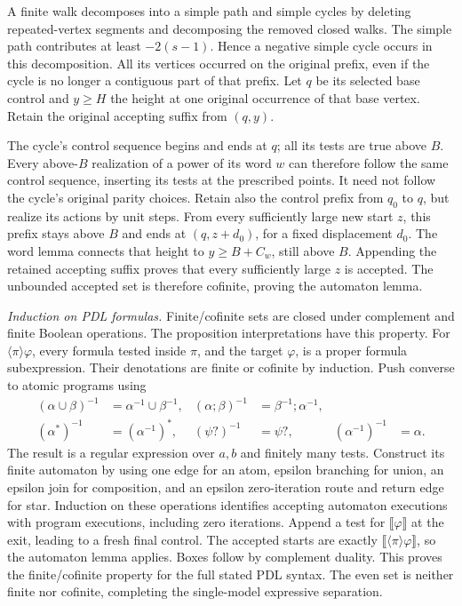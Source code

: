 A finite walk decomposes into a simple path
and simple cycles by deleting repeated-vertex
segments and decomposing the removed closed walks.
The simple path contributes at least
\(-2(s-1)\). Hence a negative simple cycle
occurs in this decomposition. All its vertices
occurred on the original prefix, even if the
cycle is no longer a contiguous part of that
prefix. Let \(q\) be its selected base control
and \(y\geq H\) the height at one original
occurrence of that base vertex. Retain the
original accepting suffix from \((q,y)\).

The cycle's control sequence begins and ends
at \(q\); all its tests are true above \(B\).
Every above-\(B\) realization of a power of
its word \(w\) can therefore follow the same
control sequence, inserting its tests at the
prescribed points. It need not follow the
cycle's original parity choices.
Retain also the control prefix from \(q_0\)
to \(q\), but realize its actions by unit
steps. From every sufficiently large new
start \(z\), this prefix stays above \(B\)
and ends at \((q,z+d_0)\), for a fixed
displacement \(d_0\).
The word lemma connects that height to
\(y\geq B+C_w\), still above \(B\).
Appending the retained accepting suffix
proves that every sufficiently large \(z\)
is accepted. The unbounded accepted set is
therefore cofinite, proving the automaton lemma.

\emph{Induction on PDL formulas.}
Finite/cofinite sets are closed under complement
and finite Boolean operations. The proposition
interpretations have this property.
For \(\langle\pi\rangle\varphi\), every formula
tested inside \(\pi\), and the target \(\varphi\),
is a proper formula subexpression. Their
denotations are finite or cofinite by induction.
Push converse to atomic programs using
\[
\begin{aligned}
 (\alpha\cup\beta)^{-1}
   &=\alpha^{-1}\cup\beta^{-1},&
 (\alpha;\beta)^{-1}
   &=\beta^{-1};\alpha^{-1},\\
 (\alpha^*)^{-1}&=(\alpha^{-1})^*,&
 (\psi?)^{-1}&=\psi?,&
 (\alpha^{-1})^{-1}&=\alpha.
\end{aligned}
\]
The result is a regular expression over \(a,b\)
and finitely many tests.
Construct its finite automaton by using one
edge for an atom, epsilon branching for union,
an epsilon join for composition, and an epsilon
zero-iteration route and return edge for star.
Induction on these operations identifies
accepting automaton executions with program
executions, including zero iterations.
Append a test for \(\llbracket\varphi\rrbracket\)
at the exit, leading to a fresh final control.
The accepted starts are exactly
\(\llbracket\langle\pi\rangle\varphi\rrbracket\),
so the automaton lemma applies.
Boxes follow by complement duality.
This proves the finite/cofinite property for
the full stated PDL syntax. The even set is
neither finite nor cofinite, completing the
single-model expressive separation.

